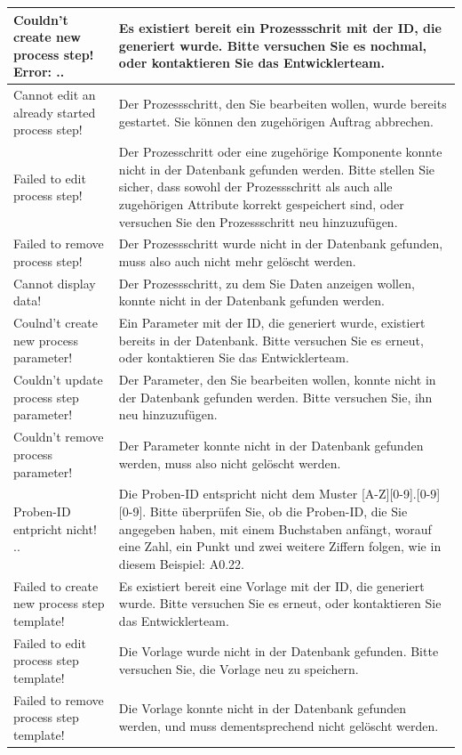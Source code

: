 \documentclass[enabledeprecatedfontcommands,fontsize=12pt,paper=a4,twoside]{scrartcl}
\begin{document}
\begin{longtable}[c]{|p{5cm}|p{10cm}|}
Couldn't create new process step! Error: .. &  Es existiert bereit ein Prozessschrit mit der ID, die generiert wurde. Bitte versuchen Sie es nochmal, oder kontaktieren Sie das Entwicklerteam. \\ \hline
Cannot edit an already started process step! & Der Prozessschritt, den Sie bearbeiten wollen, wurde bereits gestartet. Sie können den zugehörigen Auftrag abbrechen.  \\ \hline
Failed to edit process step! & Der Prozesschritt oder eine zugehörige Komponente konnte nicht in der Datenbank gefunden werden. Bitte stellen Sie sicher, dass sowohl der Prozessschritt als auch alle zugehörigen Attribute korrekt gespeichert sind, oder versuchen Sie den Prozessschritt neu hinzuzufügen. \\ \hline
Failed to remove process step! & Der Prozessschritt wurde nicht in der Datenbank gefunden, muss also auch nicht mehr gelöscht werden. \\ \hline
Cannot display data! & Der Prozessschritt, zu dem Sie Daten anzeigen wollen, konnte nicht in der Datenbank gefunden werden. \\ \hline
Coulnd't create new process parameter! & Ein Parameter mit der ID, die generiert wurde, existiert bereits in der Datenbank. Bitte versuchen Sie es erneut, oder kontaktieren Sie das Entwicklerteam. \\ \hline
Couldn't update process step parameter! & Der Parameter, den Sie bearbeiten wollen, konnte nicht in der Datenbank gefunden werden. Bitte versuchen Sie, ihn neu hinzuzufügen. \\ \hline
Couldn't remove process parameter! & Der Parameter konnte nicht in der Datenbank gefunden werden, muss also nicht gelöscht werden. \\ \hline
Proben-ID entpricht nicht! ..  & Die Proben-ID entspricht nicht dem Muster [A-Z][0-9].[0-9][0-9]. Bitte überprüfen Sie, ob die Proben-ID, die Sie angegeben haben, mit einem Buchstaben anfängt, worauf eine Zahl, ein Punkt und zwei weitere Ziffern folgen, wie in diesem Beispiel: A0.22. \\ \hline
Failed to create new process step template! & Es existiert bereit eine Vorlage mit der ID, die generiert wurde. Bitte versuchen Sie es erneut, oder kontaktieren Sie das Entwicklerteam.\\ \hline
Failed to edit process step template! & Die Vorlage wurde nicht in der Datenbank gefunden. Bitte versuchen Sie, die Vorlage neu zu speichern. \\ \hline
Failed to remove process step template! & Die Vorlage konnte nicht in der Datenbank gefunden werden, und muss dementsprechend nicht gelöscht werden. \\ \hline

\end{longtable}
\end{document}
